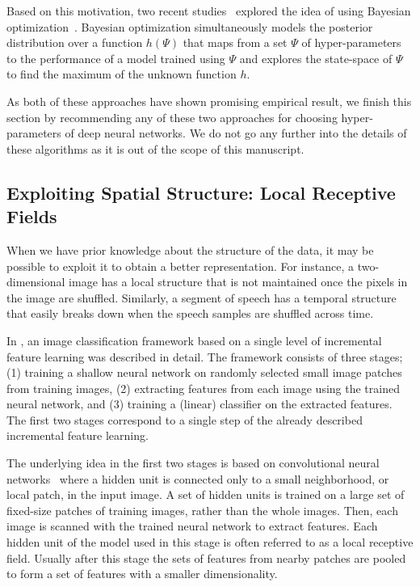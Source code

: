 \documentclass{now}
\begin{document}
Based on this motivation, two recent studies~\citep{Bergstra2011,Snoek2012}
explored the idea of using Bayesian optimization~\citep[see,
e.g.,][]{Brochu2010}.  Bayesian optimization simultaneously models the posterior
distribution over a function $h(\Psi)$ that maps from a set $\Psi$ of
hyper-parameters to the performance of a model trained using $\Psi$ and explores
the state-space of $\Psi$ to find the maximum of the unknown function $h$.

As both of these approaches have shown promising empirical result, we finish
this section by recommending any of these two approaches for choosing
hyper-parameters of deep neural networks. We do not go any further into the
details of these algorithms as it is out of the scope of this manuscript.

\subsection{Exploiting Spatial Structure: Local Receptive Fields}
\label{sec:basic_blocks2}

When we have prior knowledge about the structure of the data, it may be possible
to exploit it to obtain a better representation. For instance, a two-dimensional
image has a local structure that is not maintained once the pixels in the image
are shuffled. Similarly, a segment of speech has a temporal structure that
easily breaks down when the speech samples are shuffled across time.

In \citep{Coates2011}, an image classification framework based on a single level
of incremental feature learning was described in detail. The framework consists
of three stages; (1) training a shallow neural network on randomly selected
small image patches from training images, (2) extracting features from each
image using the trained neural network, and (3) training a (linear) classifier
on the extracted features.  The first two stages correspond to a single step of
the already described incremental feature learning.

The underlying idea in the first two stages is based on convolutional neural
networks~\citep[see, e.g.,][]{Rosenblatt1962,Fukushima80,Lecun1998,Lee2009}
where a hidden unit is connected only to a small neighborhood, or local patch,
in the input image. A set of hidden units is trained on a large set of
fixed-size patches of training images, rather than the whole images.  Then, each
image is scanned with the trained neural network to extract features.  Each
hidden unit of the model used in this stage is often referred to as a local
receptive field.  Usually after this stage the sets of features from nearby
patches are pooled to form a set of features with a smaller dimensionality.
\end{document}

